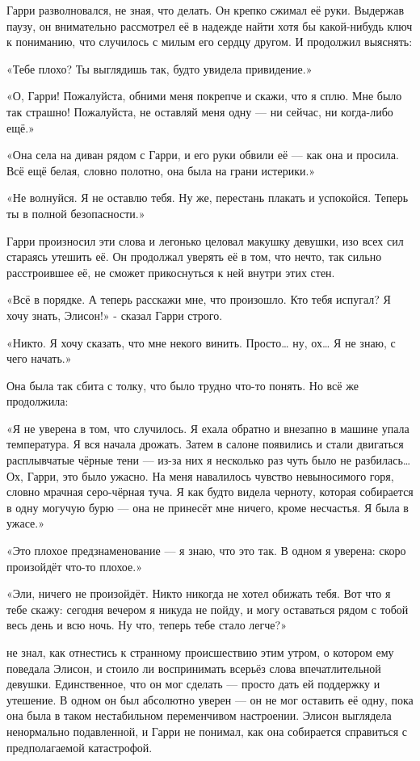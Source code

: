 \documentclass[a4paper,12pt]{book}
\begin{document}
\par
Гарри разволновался, не зная, что делать. Он крепко сжимал её руки. Выдержав паузу, он внимательно рассмотрел её в надежде найти хотя бы какой-нибудь ключ к пониманию, что случилось с милым его сердцу другом. И продолжил выяснять:
\par
«Тебе плохо? Ты выглядишь так, будто увидела привидение.»
\par
«О, Гарри! Пожалуйста, обними меня покрепче и скажи, что я сплю. Мне было так страшно! Пожалуйста, не оставляй меня одну — ни сейчас, ни когда-либо ещё.»
\par
«Она села на диван рядом с Гарри, и его руки обвили её — как она и просила. Всё ещё белая, словно полотно, она была на грани истерики.»
\par
«Не волнуйся. Я не оставлю тебя. Ну же, перестань плакать и успокойся. Теперь ты в полной безопасности.»
\par
Гарри произносил эти слова и легонько целовал макушку девушки, изо всех сил стараясь утешить её. Он продолжал уверять её в том, что нечто, так сильно расстроившее её, не сможет прикоснуться к ней внутри этих стен.
\par
«Всё в порядке. А теперь расскажи мне, что произошло. Кто тебя испугал? Я хочу знать, Элисон!» - сказал Гарри строго.
\par
«Никто. Я хочу сказать, что мне некого винить. Просто… ну, ох… Я не знаю, с чего начать.»
\par
Она была так сбита с толку, что было трудно что-то понять. Но всё же продолжила:
\par
«Я не уверена в том, что случилось. Я ехала обратно и внезапно в машине упала температура. Я вся начала дрожать. Затем в салоне появились и стали двигаться расплывчатые чёрные тени — из-за них я несколько раз чуть было не разбилась… Ох, Гарри, это было ужасно. На меня навалилось чувство невыносимого горя, словно мрачная серо-чёрная туча. Я как будто видела черноту, которая собирается в одну могучую бурю — она не принесёт мне ничего, кроме несчастья. Я была в ужасе.»
\par
«Это плохое предзнаменование — я знаю, что это так. В одном я уверена: скоро произойдёт что-то плохое.»
\par
«Эли, ничего не произойдёт. Никто никогда не хотел обижать тебя. Вот что я тебе скажу: сегодня вечером я никуда не пойду, и могу оставаться рядом с тобой весь день и всю ночь. Ну что, теперь тебе стало легче?»\\
\par
{} не знал, как отнестись к странному происшествию этим утром, о котором ему поведала Элисон, и стоило ли воспринимать всерьёз слова впечатлительной девушки. Единственное, что он мог сделать — просто дать ей поддержку и утешение. В одном он был абсолютно уверен — он не мог оставить её одну, пока она была в таком нестабильном переменчивом настроении. Элисон выглядела ненормально подавленной, и Гарри не понимал, как она собирается справиться с предполагаемой катастрофой.
\end{document}
